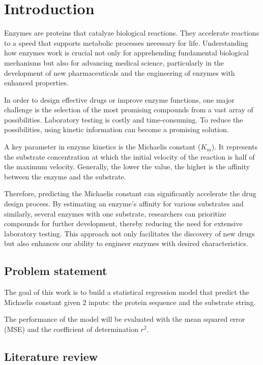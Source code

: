 
\chapter{Introduction}
\label{chap:1}

Enzymes are proteins that catalyze biological reactions. They accelerate reactions to a speed that supports metabolic processes necessary for life. Understanding how enzymes work is crucial not only for apprehending fundamental biological mechanisms but also for advancing medical science, particularly in the development of new pharmaceuticals and the engineering of enzymes with enhanced properties.

In order to design effective drugs or improve enzyme functions, one major challenge is the selection of the most promising compounds from a vast array of possibilities. Laboratory testing is costly and time-consuming. To reduce the possibilities, using kinetic information can become a promising solution.

A key parameter in enzyme kinetics is the Michaelis constant ($K_m$). It represents the substrate concentration at which the initial velocity of the reaction is half of the maximum velocity. Generally, the lower the value, the higher is the affinity between the enzyme and the substrate.

Therefore, predicting the Michaelis constant can significantly accelerate the drug design process. By estimating an enzyme's affinity for various substrates and similarly, several enzymes with one substrate, researchers can prioritize compounds for further development, thereby reducing the need for extensive laboratory testing. This approach not only facilitates the discovery of new drugs but also enhances our ability to engineer enzymes with desired characteristics.

\section{Problem statement}

The goal of this work is to build a statistical regression model that predict the Michaelis constant given 2 inputs: the protein sequence and the substrate string. 

The performance of the model will be evaluated with the mean squared error (MSE) and the coefficient of determination $r^2$.

\section{Literature review}


